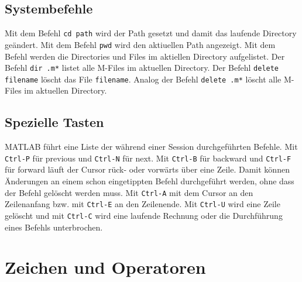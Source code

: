 {\subsection{Systembefehle}
Mit dem Befehl {\color{red}\texttt{cd path}} wird der Path gesetzt und damit das laufende Directory geändert. Mit dem Befehl {\color{red}\texttt{pwd}} wird den aktiuellen Path angezeigt. 
\newline\newline
Mit dem Befehl  werden die Directories und Files im aktiellen Directory aufgelistet. Der Befehl {\color{red}\texttt{dir .m*}} listet alle M-Files im aktuellen Directory. Der Befehl {\color{red}\texttt{delete filename}} löscht das File \texttt{filename}. Analog der Befehl {\color{red}\texttt{delete .m*}} löscht alle M-Files im aktuellen Directory.
\subsection{Spezielle Tasten}
MATLAB führt eine Liste der während einer Session durchgeführten Befehle. Mit {\color{red}\texttt{Ctrl-P}} für previous und {\color{red}\texttt{Ctrl-N}} für next. Mit {\color{red}\texttt{Ctrl-B}} für backward und {\color{red}\texttt{Ctrl-F}} für forward läuft der Cursor rück- oder vorwärts über eine Zeile. Damit können Änderungen an einem schon eingetippten Befehl durchgeführt werden, ohne dass der Befehl gelöscht werden muss. Mit {\color{red}\texttt{Ctrl-A}} mit dem Cursor an den Zeilenanfang bzw. mit {\color{red}\texttt{Ctrl-E}} an den Zeilenende. Mit {\color{red}\texttt{Ctrl-U}} wird eine Zeile gelöscht und mit {\color{red}\texttt{Ctrl-C}} wird eine laufende Rechnung oder die Durchführung eines Befehls unterbrochen.
\section{Zeichen und Operatoren}
}
